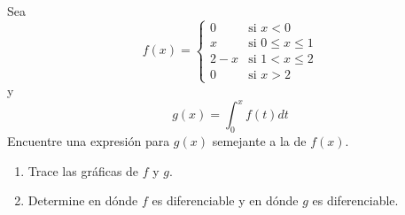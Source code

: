 \item Sea
$$f(x) = \begin{cases} 
0 & \text{si } x < 0 \\ 
x & \text{si } 0 \le x \le 1 \\ 
2 - x & \text{si } 1 < x \le 2 \\ 
0 & \text{si } x > 2 
\end{cases}$$
y
$$g(x) = \int_0^x f(t) dt$$
Encuentre una expresión para $g(x)$ semejante a la de $f(x)$.
\begin{enumerate}
    \item[(b)] Trace las gráficas de $f$ y $g$.
    \item[(c)] Determine en dónde $f$ es diferenciable y en dónde $g$ es diferenciable.
\end{enumerate}
